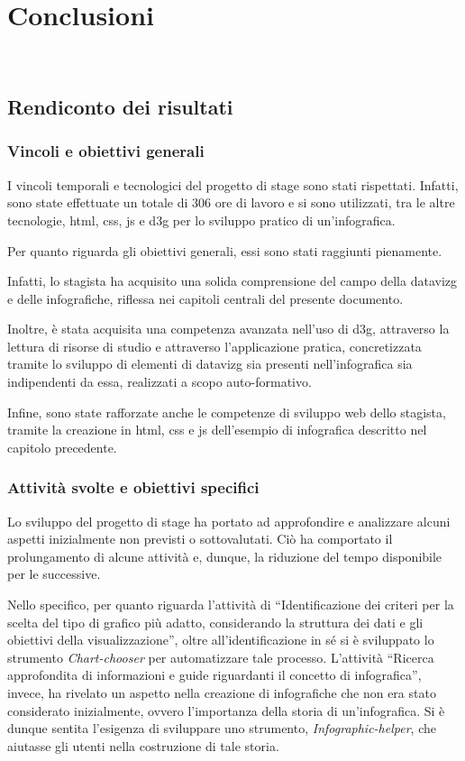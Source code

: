 \chapter{Conclusioni}
\label{cap:conclusioni}
\\

\section{Rendiconto dei risultati}
\subsection{Vincoli e obiettivi generali}
I vincoli temporali e tecnologici del progetto di stage sono stati rispettati. 
Infatti, sono state effettuate un totale di 306 ore di lavoro e si sono utilizzati, tra le altre tecnologie, 
\gls{html}, \gls{css}, \gls{js} e \gls{d3g} per lo sviluppo pratico di un'infografica.

\bigskip
\noindent Per quanto riguarda gli obiettivi generali, essi sono stati raggiunti pienamente.

Infatti, lo stagista ha acquisito una solida comprensione del campo 
della \gls{datavizg} e delle infografiche, riflessa nei capitoli centrali del presente documento. 

Inoltre, è stata acquisita una competenza avanzata nell'uso di \gls{d3g}, attraverso la lettura di risorse di studio e 
attraverso l'applicazione pratica, concretizzata tramite lo sviluppo di elementi di \gls{datavizg} sia presenti nell'infografica sia  
indipendenti da essa, realizzati a scopo auto-formativo.

Infine, sono state rafforzate anche le competenze di sviluppo web dello stagista, tramite la creazione in \gls{html}, \gls{css} e \gls{js} dell'esempio di infografica 
descritto nel capitolo precedente.

\subsection{Attività svolte e obiettivi specifici}
Lo sviluppo del progetto di stage ha portato ad approfondire e analizzare alcuni aspetti inizialmente non previsti o sottovalutati. 
Ciò ha comportato il prolungamento di alcune attività e, dunque, la riduzione del tempo disponibile per le successive.

Nello specifico, per quanto riguarda l'attività di ``Identificazione dei criteri per la scelta del tipo di grafico più adatto, considerando la struttura dei
dati e gli obiettivi della visualizzazione'', oltre all'identificazione in sé si è sviluppato lo strumento \emph{Chart-chooser} per automatizzare tale processo. 
L'attività ``Ricerca approfondita di informazioni e guide riguardanti il concetto di infografica'', invece, ha rivelato un aspetto nella creazione di infografiche che 
non era stato considerato inizialmente, ovvero l'importanza della storia di un'infografica. Si è dunque sentita l'esigenza di sviluppare uno strumento, 
\emph{Infographic-helper}, che aiutasse gli utenti nella costruzione di tale storia.

